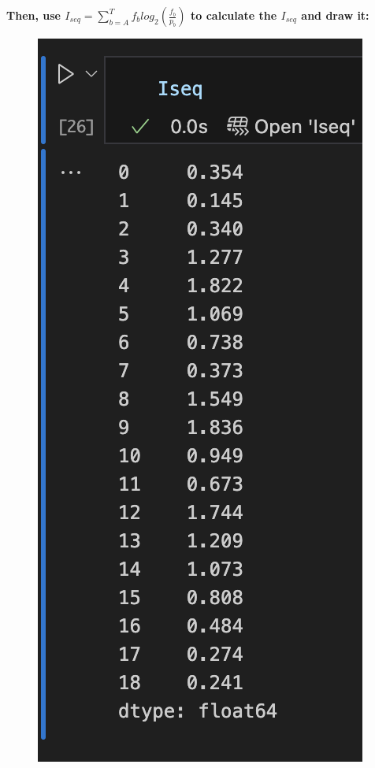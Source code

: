 \documentclass{article}
\begin{document}
\textbf{Then, use $I_{seq} =  \sum_{b=A}^T f_b log_2 (\frac{f_b}{p_b})$ to calculate the $I_{seq}$ and draw it:
}

\begin{figure}[H]
    \centering
    \begin{minipage}{0.15\textwidth}
        \centering
        \includegraphics[width=\textwidth]{Iseq.png}


\end{minipage}
\end{figure}
\end{document}
